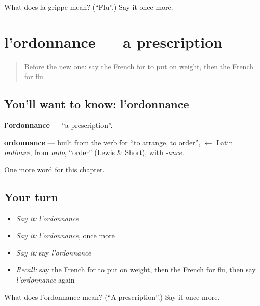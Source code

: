 \begin{tcolorbox}[breakable,colback=teal!4,colframe=teal!35!black,title={Before you move on}]
What does la grippe mean? (\textquotedblleft{}Flu\textquotedblright{}.) Say it once more.
\end{tcolorbox}
\section[l'ordonnance]{l'ordonnance — a prescription}

\label{lesson:FR-C215-ordonnance}



\begin{quote}
Before the new one: say the French for to put on weight, then the French for flu.
\end{quote}

\subsection*{You'll want to know: l'ordonnance}
\textbf{l'ordonnance} — \textquotedblleft{}a prescription\textquotedblright{}.

\begin{cousinweb}
\textbf{ordonnance} — built from the verb for \textquotedblleft{}to arrange, to order\textquotedblright{}, $\leftarrow$ Latin \emph{ordinare}, from \emph{ordo}, \textquotedblleft{}order\textquotedblright{} (Lewis \& Short), with \emph{-ance}.
\end{cousinweb}

\begin{grammarlens}[title={What you've built}]
One more word for this chapter.
\end{grammarlens}

\subsection*{Your turn}
\begin{itemize}
\raggedright
  \item \emph{Say it:} \emph{l'ordonnance}
  \item \emph{Say it:} \emph{l'ordonnance}, once more
  \item \emph{Say it:} say \emph{l'ordonnance}
  \item \emph{Recall:} say the French for to put on weight, then the French for flu, then say \emph{l'ordonnance} again
\end{itemize}

\begin{tcolorbox}[breakable,colback=teal!4,colframe=teal!35!black,title={Before you move on}]
What does l'ordonnance mean? (\textquotedblleft{}A prescription\textquotedblright{}.) Say it once more.
\end{tcolorbox}
